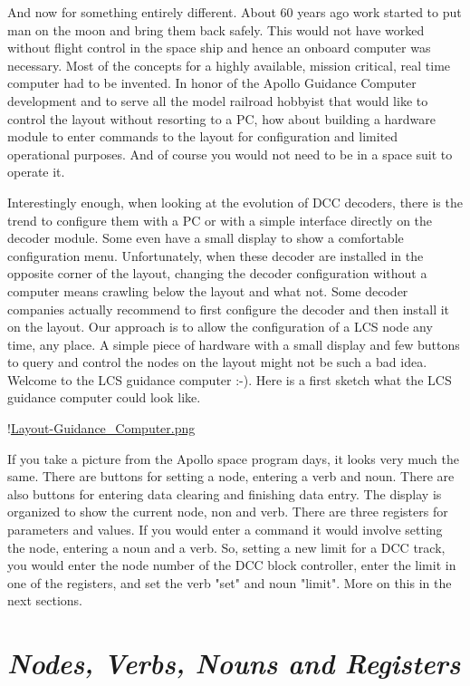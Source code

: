 
And now for something entirely different. About 60 years ago work started to put man on the moon and bring them back safely. This would not have worked without flight control in the space ship and hence an onboard computer was necessary. Most of the concepts for a highly available, mission critical, real time computer had to be invented. In honor of the Apollo Guidance Computer development and to serve all the model railroad hobbyist that would like to control the layout without resorting to a PC, how about building a hardware module to enter commands to the layout for configuration and limited operational purposes. And of course you would not need to be in a space suit to operate it.

Interestingly enough, when looking at the evolution of DCC decoders, there is the trend to configure them with a PC or with a simple interface directly on the decoder module. Some even have a small display to show a comfortable configuration menu. Unfortunately, when these decoder are installed in the opposite corner of the layout, changing the decoder configuration without a computer means crawling below the layout and what not. Some decoder companies actually recommend to first configure the decoder and then install it on the layout. Our approach is to allow the configuration of a LCS node any time, any place. A simple piece of hardware with a small display and few buttons to query and control the nodes on the layout might not be such a bad idea. Welcome to the LCS guidance computer :-). Here is a first sketch what the LCS guidance computer could look like.

!\href{./Figures/Layout-Guidance-Computer.png }{Layout-Guidance_Computer.png}

If you take a picture from the Apollo space program days, it looks very much the same. There are buttons for setting a node, entering a verb and noun. There are also buttons for entering data clearing and finishing data entry. The display is organized to show the current node, non and verb. There are three registers for parameters and values. If you would enter a command it would involve setting the node, entering a noun and a verb. So, setting a new limit for a DCC track, you would enter the node number of the DCC block controller, enter the limit in one of the registers, and set the verb "set" and noun "limit". More on this in the next sections.

\section{\textit{Nodes, Verbs, Nouns and Registers}}

